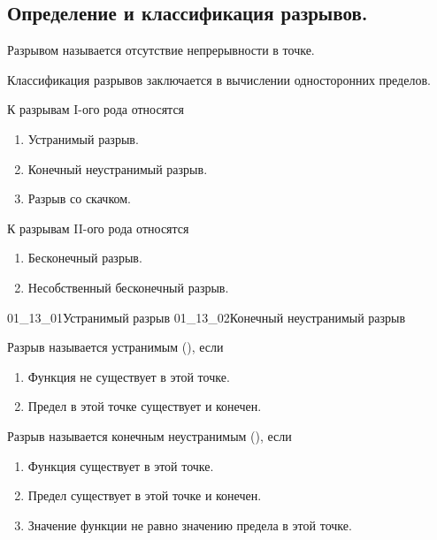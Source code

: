 \subsection{%
  Определение и классификация разрывов.%
}

\begin{definition}
  Разрывом называется отсутствие непрерывности в точке.
\end{definition}


Классификация разрывов заключается в вычислении односторонних пределов.

К разрывам I-ого рода относятся

\begin{enumerate}
\item
  Устранимый разрыв.

\item
  Конечный неустранимый разрыв.

\item
  Разрыв со скачком.
\end{enumerate}

К разрывам II-ого рода относятся

\begin{enumerate}
\item
  Бесконечный разрыв.

\item
  Несобственный бесконечный разрыв.
\end{enumerate}

\gallerydouble
  {01_13_01}{Устранимый разрыв}
  {01_13_02}{Конечный неустранимый разрыв}

\begin{definition}
  Разрыв называется устранимым (), если

  \begin{enumerate}
  \item
    Функция не существует в этой точке.

  \item
    Предел в этой точке существует и конечен.
  \end{enumerate}
\end{definition}

\begin{definition}
  Разрыв называется конечным неустранимым (), если
  
  \begin{enumerate}
  \item
    Функция существует в этой точке.

  \item 
    Предел существует в этой точке и конечен.

  \item
    Значение функции не равно значению предела в этой точке.
  \end{enumerate}
\end{definition}

